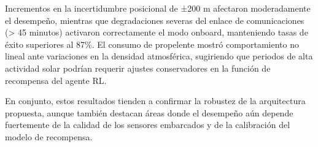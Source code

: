 Incrementos en la incertidumbre posicional de ±200 m afectaron moderadamente el desempeño, mientras que degradaciones severas del enlace de comunicaciones (> 45 minutos) activaron correctamente el modo onboard, manteniendo tasas de éxito superiores al 87\%. El consumo de propelente mostró comportamiento no lineal ante variaciones en la densidad atmosférica, sugiriendo que periodos de alta actividad solar podrían requerir ajustes conservadores en la función de recompensa del agente RL.

En conjunto, estos resultados tienden a confirmar la robustez de la arquitectura propuesta, aunque también destacan áreas donde el desempeño aún depende fuertemente de la calidad de los sensores embarcados y de la calibración del modelo de recompensa.